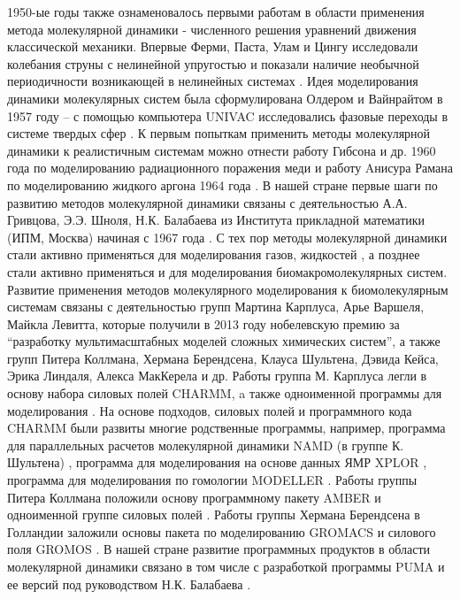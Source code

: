 1950-ые годы также ознаменовалось первыми работам в области применения метода молекулярной динамики - численного решения уравнений движения классической механики. 
Впервые Ферми, Паста, Улам и Цингу исследовали колебания струны с нелинейной упругостью и показали наличие необычной периодичности возникающей в нелинейных системах \cite{fermi_studies_1955}. 
Идея моделирования динамики молекулярных систем была сформулирована Олдером и Вайнрайтом в 1957 году -- с помощью компьютера UNIVAC исследовались фазовые переходы в системе твердых сфер \cite{alder_phase_1957}. К первым попыткам применить методы молекулярной динамики к реалистичным системам можно отнести работу Гибсона и др. 1960 года по моделированию радиационного поражения меди \cite{gibson_dynamics_1960} и работу Aнисура Рамана по моделированию жидкого аргона 1964 года \cite{rahman_correlations_1964}. В нашей стране первые шаги по развитию методов молекулярной динамики связаны с деятельностью А.А. Гривцова, Э.Э. Шноля, Н.К. Балабаева из Института прикладной математики (ИПМ, Москва) начиная с 1967 года \cite{grivtsov_metodika_1996}. С тех пор методы молекулярной динамики стали активно применяться для моделирования газов, жидкостей \cite{allen_computer_1989}, а  позднее стали активно применяться и для моделирования биомакромолекулярных систем. Развитие применения методов молекулярного моделирования к биомолекулярным системам связаны с деятельностью групп Мартина Карплуса, Арье Варшеля, Майкла Левитта, которые получили в 2013 году нобелевскую премию за ``разработку мультимасштабных моделей сложных химических систем'', а также групп Питера Коллмана, Хермана Берендсена, Клауса Шультена, Дэвида Кейса, Эрика Линдаля, Алекса МакКерела и др. Работы группа М. Карплуса легли в основу набора силовых полей CHARMM, a также одноименной программы для моделирования \cite{karplus_molecular_2003}. На основе подходов, силовых полей и программного кода CHARMM были развиты многие родственные программы, например, программа для параллельных расчетов молекулярной динамики NAMD (в группе К. Шультена) \cite{phillips_scalable_2020}, программа для моделирования на основе данных ЯМР XPLOR \cite{schwieters_xplor-nih_2003}, программа для моделирования по гомологии MODELLER \cite{sali_comparative_1993}. Работы группы Питера Коллмана положили основу программному пакету AMBER и одноименной группе силовых полей \cite{case_amber_nodate}. Работы группы Хермана Берендсена в Голландии заложили основы пакета по моделированию GROMACS \cite{lindahl_gromacs_2020} и силового поля GROMOS \cite{soares_improved_2005}. В нашей стране развитие программных продуктов в области молекулярной динамики связано в том числе с разработкой программы PUMA и ее версий под руководством Н.К. Балабаева \cite{likhachev_parallelism_2018}.

